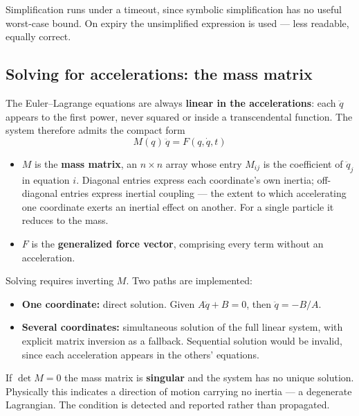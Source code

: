 \documentclass[11pt,a4paper]{article}
\begin{document}
Simplification runs under a timeout, since symbolic simplification has no useful worst-case bound. On
expiry the unsimplified expression is used --- less readable, equally correct.

\subsection{Solving for accelerations: the mass matrix}
\label{sec:massmatrix}

The Euler--Lagrange equations are always \textbf{linear in the accelerations}: each $\ddot q$ appears
to the first power, never squared or inside a transcendental function. The system therefore admits
the compact form
\begin{equation}
M(q)\,\ddot{q} = F(q, \dot q, t)
\end{equation}

\begin{itemize}[leftmargin=1.4em,itemsep=0.3em]
  \item $M$ is the \textbf{mass matrix}, an $n \times n$ array whose entry $M_{ij}$ is the
        coefficient of $\ddot q_j$ in equation $i$. Diagonal entries express each coordinate's own
        inertia; off-diagonal entries express inertial coupling --- the extent to which accelerating
        one coordinate exerts an inertial effect on another. For a single particle it reduces to the
        mass.
  \item $F$ is the \textbf{generalized force vector}, comprising every term without an acceleration.
\end{itemize}

Solving requires inverting $M$. Two paths are implemented:

\begin{itemize}[leftmargin=1.4em,itemsep=0.25em]
  \item \textbf{One coordinate:} direct solution. Given $A\ddot q + B = 0$, then $\ddot q = -B/A$.
  \item \textbf{Several coordinates:} simultaneous solution of the full linear system, with explicit
        matrix inversion as a fallback. Sequential solution would be invalid, since each acceleration
        appears in the others' equations.
\end{itemize}

If $\det M = 0$ the mass matrix is \textbf{singular} and the system has no unique solution.
Physically this indicates a direction of motion carrying no inertia --- a degenerate Lagrangian. The
condition is detected and reported rather than propagated.
\end{document}
